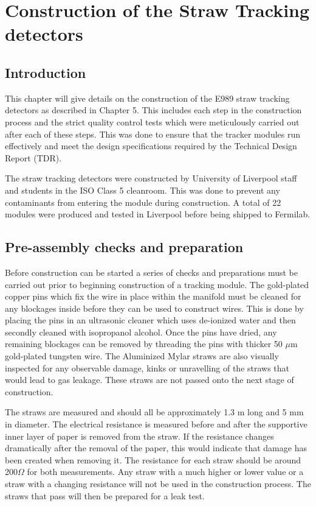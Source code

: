 
\chapter{Construction of the Straw Tracking detectors} %

\label{Chapter5} %

\section{Introduction}

This chapter will give details on the construction of the E989 straw tracking detectors as described in Chapter 5. This includes each step in the construction process and the strict quality control tests which were meticulously carried out after each of these steps. This was done to ensure that the tracker modules run effectively and meet the design specifications required by the Technical Design Report (TDR)\cite{Reference29}.

The straw tracking detectors were constructed by University of Liverpool staff and students in the ISO Class 5 cleanroom. This was done to prevent any contaminants from entering the module during construction. A total of 22 modules were produced and tested in Liverpool before being shipped to Fermilab. 

\section{Pre-assembly checks and preparation}

Before construction can be started a series of checks and preparations must be carried out prior to beginning construction of a tracking module. The gold-plated copper pins which fix the wire in place within the manifold must be cleaned for any blockages inside before they can be used to construct wires. This is done by placing the pins in an ultrasonic cleaner which uses de-ionized water and then secondly cleaned with isopropanol alcohol. Once the pins have dried, any remaining blockages can be removed by threading the pins with thicker 50 $\mu$m gold-plated tungsten wire. The Aluminized Mylar straws are also visually inspected for any observable damage, kinks or unravelling of the straws that would lead to gas leakage. These straws are not passed onto the next stage of construction. 

The straws are measured and should all be approximately 1.3 m long and 5 mm in diameter. The electrical resistance is measured before and after the supportive inner layer of paper is removed from the straw. If the resistance changes dramatically after the removal of the paper, this would indicate that damage has been created when removing it. The resistance for each straw should be around 200$\Omega$ for both measurements. Any straw with a much higher or lower value or a straw with a changing resistance will not be used in the construction process. The straws that pass will then be prepared for a leak test. 

